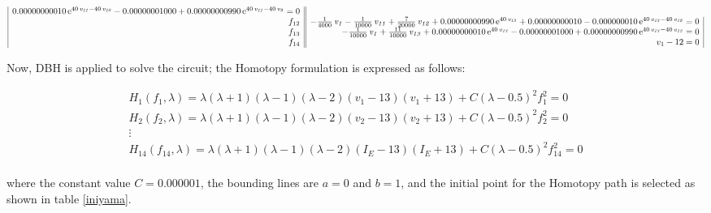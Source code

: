 \documentclass[conference,letterpaper,onecolumn]{IEEEtran}
\begin{document}
{{\begin{equation}
\begin{array}{|r||r|}
 0.00000000010\,{{\rm e}^{40\,{\it v_{11}}-40\,{\it v_{10}}}}- 0.00000001000
+ 0.00000000990\,{{\rm e}^{40\,{\it v_{11}}-40\,{\it v_9}}}=0 \\
f_{12} & -{\frac {1}{4000}}\,{\it v_1}-{\frac {1}{10000}}\,{\it v_{11}}+{\frac {7}{
20000}}\,{\it v_{12}}+ 0.00000000990\,{{\rm e}^{40\,{\it v_{13}}}}+
 0.00000000010- 0.000000010\,{{\rm e}^{40\,{\it v_{13}}-40\,{\it v_{12}}}}=0 \\
f_{13} & -{\frac {1}{10000}}\,{\it v_1}+{\frac {11}{10000}}\,{\it v_{13}}+
 0.00000000010\,{{\rm e}^{40\,{\it v_{13}}}}- 0.00000001000+
 0.00000000990\,{{\rm e}^{40\,{\it v_{13}}-40\,{\it v_{12}}}}=0 \\
 f_{14} & v_1-12=0 \\
\end{array}
\label{eqsd}
\end{equation}}

Now, DBH is applied to solve the circuit; the Homotopy formulation is expressed as follows:

\begin{displaymath}
\begin{array}{c}
H_1(f_1,\lambda)=\lambda(\lambda+1)(\lambda-1)(\lambda-2)(v_1-13)(v_1+13)+C(\lambda-0.5)^2 f_1^2=0\\
H_2(f_2,\lambda)=\lambda(\lambda+1)(\lambda-1)(\lambda-2)(v_2-13)(v_2+13)+C(\lambda-0.5)^2 f_2^2=0\\
\vdots \\
H_{14}(f_{14},\lambda)=\lambda(\lambda+1)(\lambda-1)(\lambda-2)(I_E-13)(I_E+13)+C(\lambda-0.5)^2 f_{14}^2=0\\
\end{array}
\end{displaymath}

where the constant value $C=0.000001$, the bounding lines are $a=0$ and $b=1$, and the initial point for the Homotopy path is selected as shown in table \ref{iniyama}.

\begin{table}[tbp]
{\small
{}
}
\caption{Initial point and final point.}
\label{iniyama}
\end{table}

}
\end{document}
